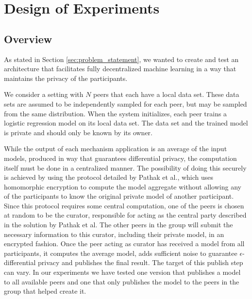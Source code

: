 \chapter{Design of Experiments}

\section{Overview}
\label{sec:experiment_overview}
As stated in Section \ref{sec:problem_statement}, we wanted to create and test an architecture that facilitates fully decentralized machine learning in a way that maintains the privacy of the participants. 

We consider a setting with $N$ peers that each have a local data set. These data sets are assumed to be independently sampled for each peer, but may be sampled from the same distribution. When the system initializes, each peer trains a logistic regression model on its local data set. The data set and the trained model is private and should only be known by its owner.


While the output of each mechanism application is an average of the input models, produced in way that guarantees differential privacy, the computation itself must be done in a centralized manner. The possibility of doing this securely is achieved by using the protocol detailed by Pathak et al., which uses homomorphic encryption to compute the model aggregate without allowing any of the participants to know the original private model of another participant\citep{pathak2010diffprivhomo}. Since this protocol requires some central computation, one of the peers is chosen at random to be the curator, responsible for acting as the central party described in the solution by Pathak et al. The other peers in the group will submit the necessary information to this curator, including their private model, in an encrypted fashion. Once the peer acting as curator has received a model from all participants, it computes the average model, adds sufficient noise to guarantee $\epsilon$-differential privacy and publishes the final result. The target of this publish step can vary. In our experiments we have tested one version that publishes a model to all available peers and one that only publishes the model to the peers in the group that helped create it.

